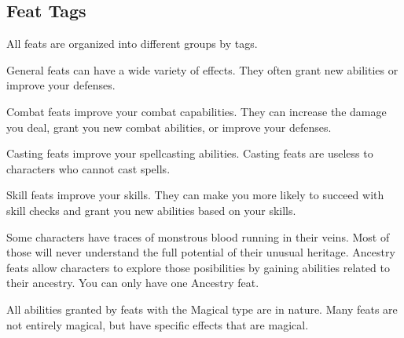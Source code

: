   \subsection{Feat Tags}
    All feats are organized into different groups by tags.

     General feats can have a wide variety of effects.
    They often grant new abilities or improve your defenses.

     Combat feats improve your combat capabilities.
    They can increase the damage you deal, grant you new combat abilities, or improve your defenses.

     Casting feats improve your spellcasting abilities.
    Casting feats are useless to characters who cannot cast spells.

     Skill feats improve your skills.
    They can make you more likely to succeed with skill checks and grant you new abilities based on your skills.

     Some characters have traces of monstrous blood running in their veins.
    Most of those will never understand the full potential of their unusual heritage.
    Ancestry feats allow characters to explore those posibilities by gaining abilities related to their ancestry.
    You can only have one Ancestry feat.

    All abilities granted by feats with the Magical type are \magical in nature.
    Many feats are not entirely magical, but have specific effects that are magical.

